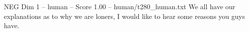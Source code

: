 \begin{textsample}{NEG Dim 1 – human – Score 1.00 – human/t280\_human.txt}  \label{ex:f1_neg_003}
We all have our explanations as to why we are loners, I would like to hear some reasons you guys have.

\end{textsample}
